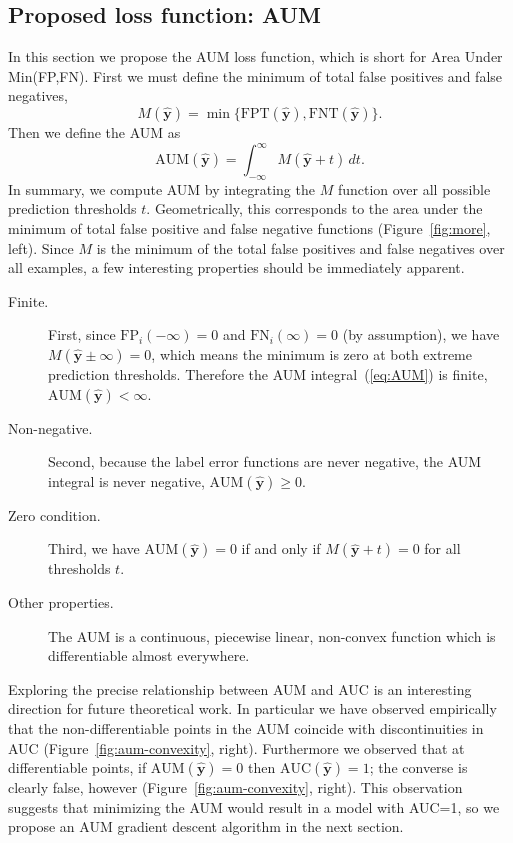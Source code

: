 \documentclass{article}
\begin{document}
\subsection{Proposed loss function: AUM}

In this section we propose the AUM loss function, which is short for Area Under Min(FP,FN).
First we must define the minimum of total false positives and false negatives, 
\begin{equation}
    M(\mathbf {\hat y}) = 
    \min\{
    \text{FPT}(\mathbf{\hat y}),
    \text{FNT}(\mathbf{\hat y})
    \}.
\end{equation}
Then we define the AUM as 
\begin{equation}
\label{eq:AUM}
    \text{AUM}(\mathbf {\hat y}) =
    \int_{-\infty}^{\infty}
    M(\mathbf {\hat y} + t)\, dt.
\end{equation}
In summary, we compute AUM by integrating the $M$ function over all possible prediction thresholds $t$.
Geometrically, this corresponds to the area under the minimum of total false positive and false negative functions (Figure~\ref{fig:more}, left).
Since $M$ is the minimum of the total false positives and false negatives over all examples, a few interesting properties should be immediately apparent.
\begin{description}
    \item[Finite.] 
First, since $\text{FP}_i(-\infty)=0$ and $\text{FN}_i(\infty)=0$ (by assumption), we have $M(\mathbf{\hat y}\pm\infty)=0$, which means the minimum is zero at both extreme prediction thresholds. 
Therefore the AUM integral~(\ref{eq:AUM}) is finite, $\text{AUM}(\mathbf{\hat y})<\infty$.
\item[Non-negative.] Second, because the label error functions are never negative, the AUM integral is never negative, $\text{AUM}(\mathbf{\hat y})\geq 0$.
\item[Zero condition.] Third, we have $\text{AUM}(\mathbf{\hat y})=0$ if and only if $M(\mathbf{\hat y}+t)=0$ for all thresholds $t$.
\item[Other properties.] The AUM is a continuous, piecewise linear, non-convex function which is differentiable almost everywhere. 
\end{description}
Exploring the precise relationship between AUM and AUC is an interesting direction for future theoretical work.
In particular we have observed empirically that the  non-differentiable points in the AUM coincide with discontinuities in AUC (Figure~\ref{fig:aum-convexity}, right).
Furthermore we observed that at differentiable points, 
if $\text{AUM}(\mathbf{\hat y})=0$ then
$\text{AUC}(\mathbf{\hat y})=1$; 
the converse is clearly false, however (Figure~\ref{fig:aum-convexity}, right).
This observation suggests that minimizing the AUM would result in a model with AUC=1, so we propose an AUM gradient descent algorithm in the next section.
\end{document}

